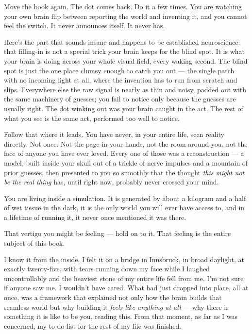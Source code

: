 \documentclass[11pt, twoside, openright]{book}
\begin{document}
Move the book again. The dot comes back. Do it a few times. You are watching your own brain flip between reporting the world and inventing it, and you cannot feel the switch. It never announces itself. It never has.

Here's the part that sounds insane and happens to be established neuroscience: that filling-in is not a special trick your brain keeps for the blind spot. It is what your brain is doing across your whole visual field, every waking second. The blind spot is just the one place clumsy enough to catch you out --- the single patch with no incoming light at all, where the invention has to run from scratch and slips. Everywhere else the raw signal is nearly as thin and noisy, padded out with the same machinery of guesses; you fail to notice only because the guesses are usually right. The dot winking out was your brain caught in the act. The rest of what you see is the same act, performed too well to notice.

Follow that where it leads. You have never, in your entire life, seen reality directly. Not once. Not the page in your hands, not the room around you, not the face of anyone you have ever loved. Every one of those was a reconstruction --- a model, built inside your skull out of a trickle of nerve impulses and a mountain of prior guesses, then presented to you so smoothly that the thought \textit{this might not be the real thing} has, until right now, probably never crossed your mind.

You are living inside a simulation. It is generated by about a kilogram and a half of wet tissue in the dark, it is the only world you will ever have access to, and in a lifetime of running it, it never once mentioned it was there.

That vertigo you might be feeling --- hold on to it. That feeling is the entire subject of this book.

I know it from the inside. I felt it on a bridge in Innsbruck, in broad daylight, at exactly twenty-five, with tears running down my face while I laughed uncontrollably and the heaviest stone of my entire life fell from me. I'm not sure if anyone saw me. I wouldn't have cared. What had just dropped into place, all at once, was a framework that explained not only how the brain builds that seamless world but why building it \textit{feels like anything at all} --- why there is something it is like to be you, reading this. From that moment, as far as I was concerned, my to-do list for the rest of my life was finished.
\end{document}
